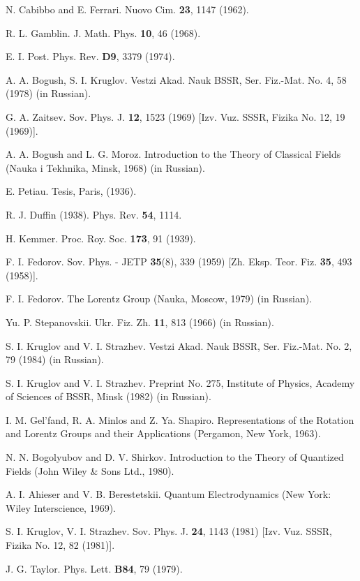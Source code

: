 \documentclass[a4paper,12pt]{article}
\begin{document}
\begin{thebibliography}{99}
\bibitem{}  N. Cabibbo and E. Ferrari. Nuovo Cim. \textbf{23}, 1147 (1962).

\bibitem{}  R. L. Gamblin. J. Math. Phys. \textbf{10}, 46 (1968).

\bibitem{}  E. I. Post. Phys. Rev. \textbf{D9}, 3379 (1974).

\bibitem{}  A. A. Bogush, S. I. Kruglov. Vestzi Akad. Nauk BSSR, Ser.
Fiz.-Mat. No. 4, 58 (1978) (in Russian).

\bibitem{}  G. A. Zaitsev. Sov. Phys. J. \textbf{12}, 1523 (1969) [Izv. Vuz.
SSSR, Fizika No. 12, 19 (1969)].

\bibitem{}  A. A. Bogush and L. G. Moroz. Introduction to the Theory
of Classical Fields (Nauka i Tekhnika, Minsk, 1968) (in Russian).

\bibitem{}  E. Petiau. Tesis, Paris, (1936).

\bibitem{}  R. J. Duffin (1938). Phys. Rev. \textbf{54}, 1114.

\bibitem{}  H. Kemmer. Proc. Roy. Soc. \textbf{173}, 91 (1939).

\bibitem{}  F. I. Fedorov. Sov. Phys. - JETP \textbf{35}(8), 339 (1959) [Zh.
Eksp. Teor. Fiz. \textbf{35}, 493 (1958)].

\bibitem{}  F. I. Fedorov. The Lorentz Group (Nauka, Moscow, 1979) (in
Russian).

\bibitem{}  Yu. P. Stepanovskii. Ukr. Fiz. Zh. \textbf{11}, 813 (1966) (in
Russian).

\bibitem{}  S. I. Kruglov and V. I. Strazhev. Vestzi Akad. Nauk BSSR,
Ser. Fiz.-Mat. No. 2, 79 (1984) (in Russian).

\bibitem{}  S. I. Kruglov and V. I. Strazhev. Preprint No. 275,
Institute of Physics, Academy of Sciences of BSSR, Minsk (1982)
(in Russian).

\bibitem{}  I. M. Gel'fand, R. A. Minlos and Z. Ya. Shapiro.
Representations of the Rotation and Lorentz Groups and their
Applications (Pergamon, New York, 1963).

\bibitem{}  N. N. Bogolyubov and D. V. Shirkov. Introduction to the
Theory of Quantized Fields (John Wiley \& Sons Ltd., 1980).

\bibitem{}  A. I. Ahieser and V. B. Berestetskii. Quantum
Electrodynamics (New York: Wiley Interscience, 1969).

\bibitem{}  S. I. Kruglov, V. I. Strazhev. Sov. Phys. J. \textbf{24},
1143 (1981) [Izv. Vuz. SSSR, Fizika No. 12, 82 (1981)].

\bibitem{}  J. G. Taylor. Phys. Lett. \textbf{B84}, 79 (1979).


\end{thebibliography}
\end{document}
